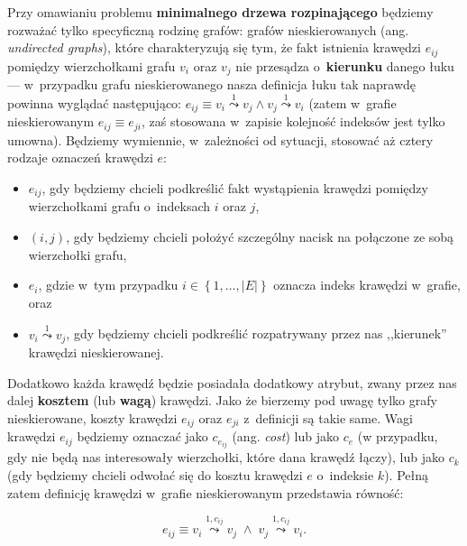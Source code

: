 Przy omawianiu problemu \textbf{minimalnego drzewa rozpinającego} będziemy rozważać tylko specyficzną rodzinę grafów: grafów nieskierowanych (ang. \textit{undirected graphs}), które charakteryzują się tym, że fakt istnienia krawędzi $e_{ij}$ pomiędzy wierzchołkami grafu $v_{i}$ oraz $v_{j}$ nie przesądza o~\textbf{kierunku} danego łuku --- w~przypadku grafu nieskierowanego nasza definicja łuku tak naprawdę powinna wyglądać następująco: $e_{ij} \equiv v_{i} \overset{1}{\leadsto} v_{j} \wedge v_{j} \overset{1}{\leadsto} v_{i}$ (zatem w~grafie nieskierowanym $e_{ij} \equiv e_{ji}$, zaś stosowana w~zapisie kolejność indeksów jest tylko umowna).
Będziemy wymiennie, w~zależności od sytuacji, stosować aż cztery rodzaje oznaczeń krawędzi $e$:

\begin{itemize}
	\item $e_{ij}$, gdy będziemy chcieli podkreślić fakt wystąpienia krawędzi pomiędzy wierzchołkami grafu o~indeksach $i$ oraz $j$,
	\item $\left( i, j \right)$, gdy będziemy chcieli położyć szczególny nacisk na połączone ze sobą wierzchołki grafu,
	\item $e_{i}$, gdzie w~tym przypadku $i \in \left\{ 1, \dots, \left| E \right| \right\}$ oznacza indeks krawędzi w~grafie, oraz
	\item $v_{i} \overset{1}{\leadsto} v_{j}$, gdy będziemy chcieli podkreślić rozpatrywany przez nas ,,kierunek'' krawędzi nieskierowanej.
\end{itemize}

Dodatkowo każda krawędź będzie posiadała dodatkowy atrybut, zwany przez nas dalej \textbf{kosztem} (lub \textbf{wagą}) krawędzi.
Jako że bierzemy pod uwagę tylko grafy nieskierowane, koszty krawędzi $e_{ij}$ oraz $e_{ji}$ z~definicji są takie same.
Wagi krawędzi $e_{ij}$ będziemy oznaczać jako $c_{e_{ij}}$ (ang. \textit{cost}) lub jako $c_{e}$ (w przypadku, gdy nie będą nas interesowały wierzchołki, które dana krawędź łączy), lub jako $c_{k}$ (gdy będziemy chcieli odwołać się do kosztu krawędzi $e$ o~indeksie $k$).
Pełną zatem definicję krawędzi w~grafie nieskierowanym przedstawia równość:

\begin{equation}
	e_{ij} \equiv v_{i} \overset{1, c_{ij}}{\leadsto} v_{j} \; \wedge \; v_{j} \overset{1, c_{ij}}{\leadsto} v_{i}\text{.}
\end{equation}

